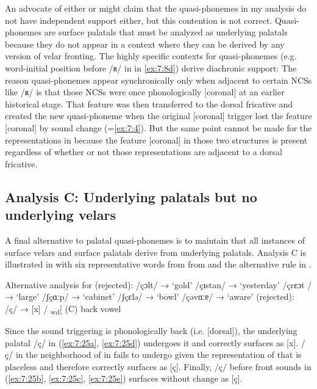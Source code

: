 An advocate of either  or  might claim that the quasi-phonemes in my analysis do not have independent support either, but this contention is not correct. Quasi-phonemes are surface palatals that must be analyzed as underlying palatals because they do not appear in a context where they can be derived by any version of velar fronting. The highly specific contexts for quasi-phonemes (e.g. word-initial position before /ʀ/ in  in \ref{ex:7:8d}) derive diachronic support: The reason quasi-phonemes appear synchronically only when adjacent to certain NCSs like /ʀ/ is that those NCSs were once phonologically [coronal] at an earlier historical stage. That feature was then transferred to the dorsal fricative and created the new quasi-phoneme when the original [coronal] trigger lost the feature [coronal] by sound change (=\ref{ex:7:4}). But the same point cannot be made for the representations in  because the feature [coronal] in those two structures is present regardless of whether or not those representations are adjacent to a dorsal fricative.

\subsection{Analysis C: Underlying palatals but no underlying velars}\label{sec:7.4.3}

A final alternative to palatal quasi-phonemes is to maintain that all instances of surface velars and surface palatals derive from underlying palatals. Analysis C is illustrated in  with six representative words from  from  and the alternative rule in .

\ea\label{ex:7:25}Alternative analysis for  (rejected):
\ea\label{ex:7:25a}/çɔlt/   \tab → \tab  [xɔlt]   \tab‘gold’
\ex\label{ex:7:25b}/çɪstan/ \tab → \tab [çɪstan]  \tab ‘yesterday’
\ex\label{ex:7:25c}/çrɛɔt / \tab → \tab [çrɛɔt]   \tab‘large’
\ex\label{ex:7:25d}/ʃçɑːp/  \tab → \tab [ʃxɑːp]   \tab‘cabinet’
\ex\label{ex:7:25e}/ʃçɛlə/  \tab →  \tab[ʃçɛlə]   \tab ‘bowl’
\ex\label{ex:7:25f}/çəvɑːɐ/ \tab  → \tab  [çəvɑːɐ]\tab  ‘aware’
\z 
\z
\ea %
\label{ex:7:26} (rejected):\smallskip\\
/ç/ → [x] / \textsubscript{wd}[ (C) {\longrule}{\longrule} back vowel
\z 

Since the sound triggering  is phonologically back (i.e. [dorsal]), the underlying palatal /ç/ in (\ref{ex:7:25a}, \ref{ex:7:25d}) undergoes it and correctly surfaces as [x]. /ç/ in the neighborhood of  in  fails to undergo  given the representation of  that is placeless and therefore correctly surfaces as [ç]. Finally, /ç/ before front sounds in (\ref{ex:7:25b}, \ref{ex:7:25c}, \ref{ex:7:25e}) surfaces without change as [ç].


